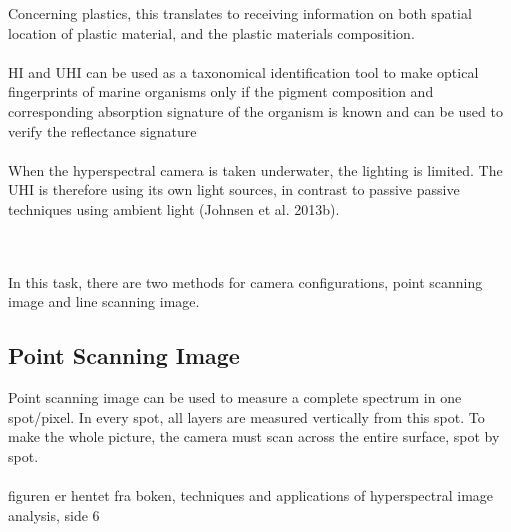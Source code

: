 Concerning plastics, this translates to receiving information on both spatial location of plastic material, and the plastic materials composition. 
\\\\
HI and UHI can be used as a taxonomical identification tool to make optical fingerprints of marine organisms only if the pigment composition and corresponding absorption signature of the organism is known and can be used to verify the reflectance signature
\\\\
When the hyperspectral camera is taken underwater, the lighting is limited. The UHI is therefore using its own light sources, in contrast to passive passive techniques using ambient light (Johnsen et al. 2013b).


\\\\In this task, there are two methods for camera configurations, point scanning image and line scanning image.
\subsection{Point Scanning Image}
Point scanning image can be used to measure a complete spectrum in one spot/pixel. In every spot, all layers are measured vertically from this spot. To make the whole picture, the camera must scan across the entire surface, spot by spot.
\\\\
figuren er hentet fra boken, techniques and applications of hyperspectral image analysis, side 6

